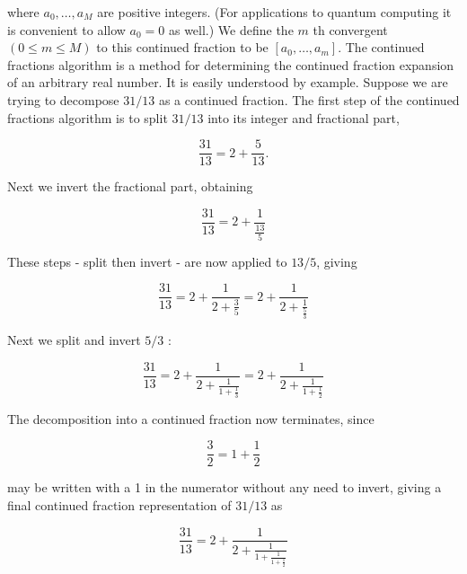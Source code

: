 where $a_{0}, \ldots, a_{M}$ are positive integers. (For applications to quantum computing it is convenient to allow $a_{0}=0$ as well.) We define the $m$ th convergent $(0 \leq m \leq M)$ to this continued fraction to be $\left[a_{0}, \ldots, a_{m}\right]$. The continued fractions algorithm is a method for determining the continued fraction expansion of an arbitrary real number. It is easily understood by example. Suppose we are trying to decompose $31 / 13$ as a continued fraction. The first step of the continued fractions algorithm is to split $31 / 13$ into its integer and fractional part,

\begin{equation*}
\frac{31}{13}=2+\frac{5}{13} . \tag{5.50}
\end{equation*}

Next we invert the fractional part, obtaining

\begin{equation*}
\frac{31}{13}=2+\frac{1}{\frac{13}{5}} \tag{5.51}
\end{equation*}

These steps - split then invert - are now applied to $13 / 5$, giving

\begin{equation*}
\frac{31}{13}=2+\frac{1}{2+\frac{3}{5}}=2+\frac{1}{2+\frac{1}{\frac{5}{3}}} \tag{5.52}
\end{equation*}

Next we split and invert $5 / 3$ :

\begin{equation*}
\frac{31}{13}=2+\frac{1}{2+\frac{1}{1+\frac{1}{3}}}=2+\frac{1}{2+\frac{1}{1+\frac{1}{2}}} \tag{5.53}
\end{equation*}

The decomposition into a continued fraction now terminates, since

\begin{equation*}
\frac{3}{2}=1+\frac{1}{2} \tag{5.54}
\end{equation*}

may be written with a 1 in the numerator without any need to invert, giving a final continued fraction representation of $31 / 13$ as

\begin{equation*}
\frac{31}{13}=2+\frac{1}{2+\frac{1}{1+\frac{1}{1+\frac{1}{2}}}} \tag{5.55}
\end{equation*}

